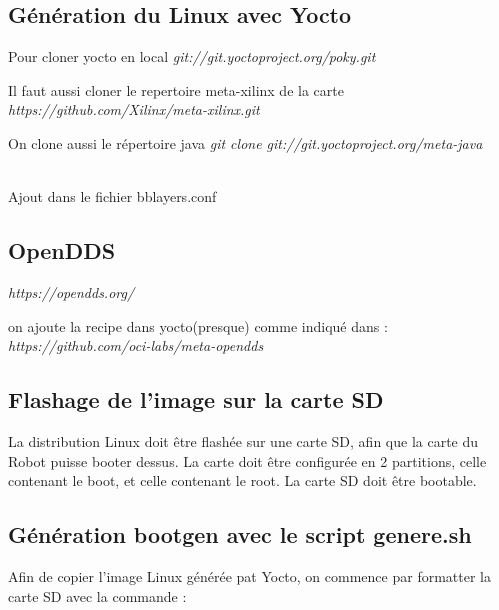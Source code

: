 \subsection{Génération du Linux avec Yocto}
Pour cloner yocto en local
\textit{git://git.yoctoproject.org/poky.git}

Il faut aussi cloner le repertoire meta-xilinx de la carte 
\textit{https://github.com/Xilinx/meta-xilinx.git}

On clone aussi le répertoire java
\textit{git clone git://git.yoctoproject.org/meta-java}

\\

Ajout dans le fichier bblayers.conf
\\
\subsection{OpenDDS}

\textit{https://opendds.org/}

on ajoute la recipe dans yocto(presque) comme indiqué dans :
\textit{https://github.com/oci-labs/meta-opendds}


\subsection{Flashage de l’image sur la carte SD}

La distribution Linux doit être flashée sur une carte SD, afin que la carte du Robot puisse booter dessus.
La carte doit être configurée en 2 partitions, celle contenant le boot, et celle contenant le root.
La carte SD doit être bootable.

\subsection{Génération bootgen avec le script genere.sh}
Afin de copier l'image Linux générée pat Yocto, on commence par formatter la carte SD avec la commande : 


